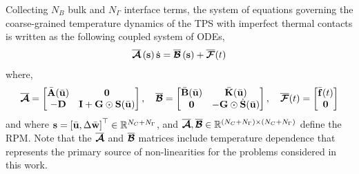 Collecting $N_B$ bulk and $N_{\Gamma}$ interface terms, the system of equations governing the coarse-grained temperature dynamics of the TPS with imperfect thermal contacts is written as the following coupled system of ODEs,
\begin{equation}
    \overline{\boldsymbol{\mathcal{A}}}\left(\mathbf{s}\right)\dot{\mathbf{s}} = \overline{\boldsymbol{\mathcal{B}}}\left(\mathbf{s}\right) + \overline{\boldsymbol{\mathcal{F}}}(t)\label{eqn_modified_lcm}
\end{equation}
where,
\begin{equation}
    \overline{\boldsymbol{\mathcal{A}}} = \begin{bmatrix}
        \bar{\mathbf{A}}(\bar{\mathbf{u}}) & \mathbf{0}\\
        -\mathbf{D} & \mathbf{I} + \mathbf{G}\odot\mathbf{S}(\bar{\mathbf{u}})
    \end{bmatrix},\quad \overline{\boldsymbol{\mathcal{B}}} = \begin{bmatrix}
        \bar{\mathbf{B}}(\bar{\mathbf{u}}) & \bar{\mathbf{K}}(\bar{\mathbf{u}})\\
        \mathbf{0} & -\mathbf{G}\odot\dot{\mathbf{S}}(\bar{\mathbf{u}})
    \end{bmatrix},\quad \overline{\boldsymbol{\mathcal{F}}}(t) = \begin{bmatrix}
        \bar{\mathbf{f}}(t) \\ \mathbf{0}
    \end{bmatrix}
\end{equation}
and where $\mathbf{s} = \left[\bar{\mathbf{u}},\Delta\bar{\mathbf{w}}\right]^\top\in\mathbb{R}^{N_C + N_{\Gamma}}$, and $\overline{\boldsymbol{\mathcal{A}}},\overline{\boldsymbol{\mathcal{B}}}\in\mathbb{R}^{(N_C + N_{\Gamma})\times(N_C+N_{\Gamma})}$ define the RPM. Note that the $\overline{\boldsymbol{\mathcal{A}}}$ and $\overline{\boldsymbol{\mathcal{B}}}$ matrices include temperature dependence that represents the primary source of non-linearities for the problems considered in this work.